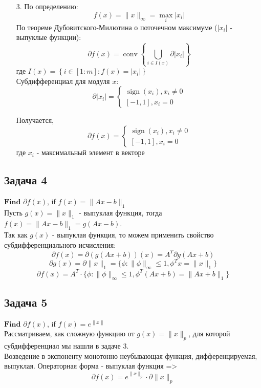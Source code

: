 \documentclass[12pt,letterpaper]{article}
\begin{document}
\begin{itemize}
	\item[3. ] По определению:
$$
f(x) = \| x \|_{\infty} = \max\limits_i |x_i|
$$
По теореме Дубовитского-Милютина о поточечном максимуме ($ |x_i| $ - выпуклые функции):
$$
\partial f(x) = \operatorname{conv}\left\{\bigcup_{i \in I\left(x\right)} \partial |x_i| \right\}
$$
где $
I(x)=\left\{i \in[1: m]: f(x)=|x_i|\right\}
$\\
Субдифференциал для модуля $ x $:
$$
\partial\left|x_{i}\right|=\left\{\begin{array}{l}
\operatorname{sign}\left(x_{i}\right), x_i \neq 0 \\
{[-1,1], x_i=0}
\end{array}\right.
$$

Получается, 
$$
\partial f(x) = \left\{\begin{array}{l}
\operatorname{sign}\left(x_{i}\right), x_i \neq 0 \\
{[-1,1], x_i=0}
\end{array}\right.
$$
где $ x_i $ - максимальный элемент в векторе
\end{itemize}
 

\subsection*{Задача 4}
$\textbf{Find}$ $\partial f(x)$, if $f(x) = \|Ax - b\|_1$\\

Пусть $ g(x) = \|x\|_1 $ - выпуклая функция, тогда $ f(x) = \|Ax - b\|_1 = g(Ax-b) $.\\
Так как $ g(x) $ - выпуклая функция, то можем применить свойство субдифференциального исчисления: 
$$ \partial f(x) = \partial(g(A x+b))(x)=A^{T} \partial g(A x+b) $$ 
$$ \partial g(x) = \partial \|x\|_1 = \{ \phi : \|\phi\|_{\infty} \leq 1, \phi^T x = \|x\|_1 \} $$
$$ \partial f(x) = A^{T} \cdot \{ \phi : \|\phi\|_{\infty} \leq 1, \phi^T (Ax + b) = \|Ax + b\|_1 \} $$

\subsection*{Задача 5}
$\textbf{Find}$ $\partial f(x)$, if $f(x) = e^{\|x\|}$\\

Рассматриваем, как сложную функцию от $ g(x) = \|x\|_p $, для которой субдифференциал мы нашли в задаче 3.\\
Возведение в экспоненту монотонно неубывающая функция, дифференцируемая, выпуклая. Операторная форма - выпуклая функция =>
$$\partial f(x) = e^{\|x\|_p} \cdot \partial \|x\|_p$$
\end{document}
